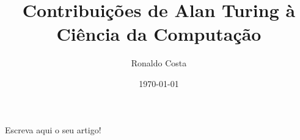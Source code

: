 \documentclass{article}
\title{Contribuições de Alan Turing à Ciência da Computação}
\date{\today}
\author{Ronaldo Costa}
\begin{document}
\maketitle
Escreva aqui o seu artigo!
\end{document}
